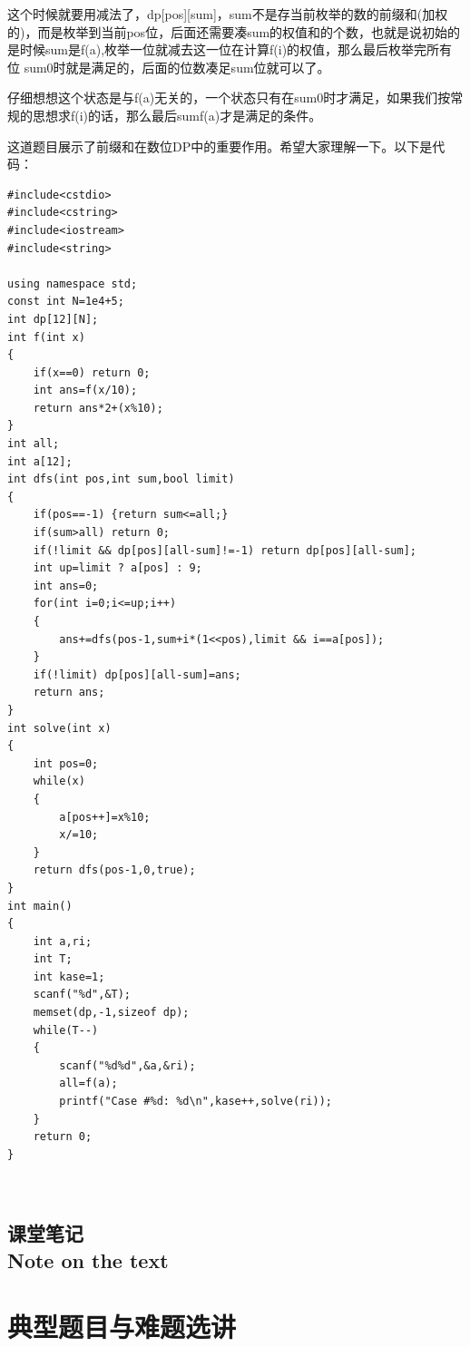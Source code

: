 \documentclass{article}
\theoremstyle{nonumberplain}
\newcommand{\note}{\ \par
	\subsection*{课堂笔记\\\tiny{Note on the text}}
	\newpage}
\begin{document}
这个时候就要用减法了，dp[pos][sum]，sum不是存当前枚举的数的前缀和(加权的)，而是枚举到当前pos位，后面还需要凑sum的权值和的个数，也就是说初始的是时候sum是f(a),枚举一位就减去这一位在计算f(i)的权值，那么最后枚举完所有位 sum\leq 0时就是满足的，后面的位数凑足sum位就可以了。

仔细想想这个状态是与f(a)无关的，一个状态只有在sum\leq 0时才满足，如果我们按常规的思想求f(i)的话，那么最后sum\leq f(a)才是满足的条件。

这道题目展示了前缀和在数位DP中的重要作用。希望大家理解一下。以下是代码：
\begin{verbatim}
#include<cstdio>  
#include<cstring>  
#include<iostream>  
#include<string>  
  
using namespace std;  
const int N=1e4+5;  
int dp[12][N];  
int f(int x)  
{  
    if(x==0) return 0;  
    int ans=f(x/10);  
    return ans*2+(x%10);  
}  
int all;  
int a[12];  
int dfs(int pos,int sum,bool limit)  
{  
    if(pos==-1) {return sum<=all;}  
    if(sum>all) return 0;  
    if(!limit && dp[pos][all-sum]!=-1) return dp[pos][all-sum];  
    int up=limit ? a[pos] : 9;  
    int ans=0;  
    for(int i=0;i<=up;i++)  
    {  
        ans+=dfs(pos-1,sum+i*(1<<pos),limit && i==a[pos]);  
    }  
    if(!limit) dp[pos][all-sum]=ans;  
    return ans;  
}  
int solve(int x)  
{  
    int pos=0;  
    while(x)  
    {  
        a[pos++]=x%10;  
        x/=10;  
    }  
    return dfs(pos-1,0,true);  
}  
int main()  
{  
    int a,ri;  
    int T;  
    int kase=1;  
    scanf("%d",&T);  
    memset(dp,-1,sizeof dp);  
    while(T--)  
    {  
        scanf("%d%d",&a,&ri);  
        all=f(a);  
        printf("Case #%d: %d\n",kase++,solve(ri));  
    }  
    return 0;  
}  
\end{verbatim}
	\note
	\section{典型题目与难题选讲}
\end{document}
